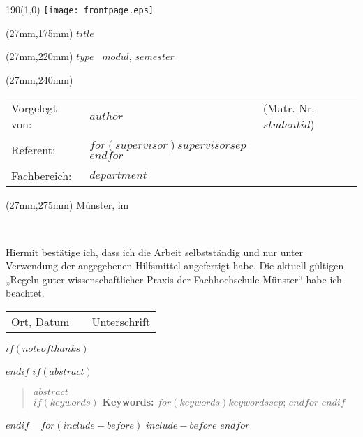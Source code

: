 \documentclass[11 pt,bibliography=totoc,listof=totoc,twoside,open=right]{scrreprt}
\begin{document}
\begin{titlepage}
\begin{textblock}{190}(1,0)
	\texttt{[image: frontpage.eps]}
\end{textblock}
\doublespacing
\begin{textblock*}{156mm}(27mm,175mm)
	\LARGE \textbf{$title$}
\end{textblock*}
\singlespacing
\begin{textblock*}{156mm}(27mm,220mm)
	\Large $type$ \ \textbf{$modul$}, $semester$
\end{textblock*}
\begin{textblock*}{156mm}(27mm,240mm)
	\normalsize
	\begin{tabularx}{120mm}{l X l}
		Vorgelegt von:&\textbf{$author$}&(Matr.-Nr. $studentid$)\\
		&&\\
		Referent:&\textbf{$for(supervisor)$$supervisor$$sep$ \newline $endfor$}\\
		&&\\
		Fachbereich:&\textbf{$department$}\\
	\end{tabularx}
\end{textblock*}
\begin{textblock*}{156mm}(27mm,275mm)
	Münster, im \makeatletter \month@ngerman \makeatother \ \the\year
\end{textblock*}
\end{titlepage}
\clearpage
\newpage \ 
\newpage \thispagestyle{empty}
\mbox{~}
\clearpage
\newpage
\thispagestyle{empty}

\newpage
\thispagestyle{empty}
\vspace*{10mm}
\normalsize
\doublespacing
Hiermit bestätige ich, dass ich die Arbeit selbstständig und nur unter Verwendung der angegebenen Hilfsmittel angefertigt habe. Die aktuell gültigen „Regeln guter wissenschaftlicher Praxis der Fachhochschule Münster“ habe ich beachtet.
\vspace{20mm}
\hspace{-1cm}
\begin{table}[h]
	\centering
	\begin{tabular}{p{50mm}p{50mm}p{50mm}}
		Ort, Datum& &Unterschrift
	\end{tabular}
\end{table}
$if(noteofthanks)$
\newpage
\newpage

$endif$
\newpage
\thispagestyle{empty}
\onehalfspacing
$if(abstract)$
\begin{abstract}
$abstract$\\
$if(keywords)$
\textbf{Keywords:} $for(keywords)$$keywords$$sep$; $endfor$
$endif$
\end{abstract}
$endif$
\newpage \ \thispagestyle{empty} \setcounter{page}{0} \newpage
$for(include-before)$
$include-before$
$endfor$
\end{document}
